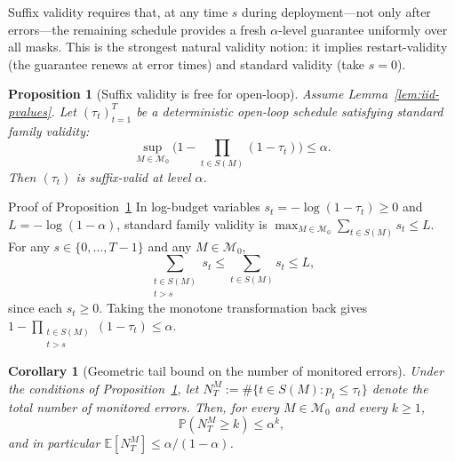 \documentclass{uai2026} %
\newtheorem{proposition}[theorem]{Proposition}
\newtheorem{corollary}[theorem]{Corollary}
\newcommand{\1}{\mathbf{1}}
\newcommand{\prob}{\mathbb{P}}
\newcommand{\expec}{\mathbb{E}}
\newcommand{\mcal}{\mathcal{M}}
\begin{document}
Suffix validity requires that, at any time $s$ during deployment---not only after errors---the remaining schedule provides a fresh $\alpha$-level guarantee uniformly over all masks.
This is the strongest natural validity notion: it implies restart-validity (the guarantee renews at error times) and standard validity (take $s=0$).

\begin{proposition}[Suffix validity is free for open-loop]
  \label{prop:suffix-validity}
  Assume Lemma~\ref{lem:iid-pvalues}.
  Let $(\tau_{t})_{t=1}^{T}$ be a deterministic open-loop schedule satisfying standard family validity:
  \begin{equation*}
    \sup_{M\in\mcal_{0}}\bigl(1-\prod_{t\in S(M)}(1-\tau_{t})\bigr)\le\alpha.
  \end{equation*}
  Then $(\tau_{t})$ is suffix-valid at level $\alpha$.
\end{proposition}

\begin{appendixproof}{Proof of Proposition~\ref{prop:suffix-validity}}
  In log-budget variables $s_{t}=-\log(1-\tau_{t})\ge 0$ and $L=-\log(1-\alpha)$, standard family validity is $\max_{M\in\mcal_{0}}\sum_{t\in S(M)} s_{t}\le L$.
  For any $s\in\{0,\dots,T-1\}$ and any $M\in\mcal_{0}$,
  \begin{equation*}
    \sum_{\substack{t\in S(M)\\t>s}} s_{t}
    \le
    \sum_{t\in S(M)} s_{t}
    \le L,
  \end{equation*}
  since each $s_{t}\ge 0$.
  Taking the monotone transformation back gives $1-\prod_{\substack{t\in S(M)\\t>s}}(1-\tau_{t})\le\alpha$.
\end{appendixproof}

\begin{corollary}[Geometric tail bound on the number of monitored errors]
  \label{cor:geometric-tail}
  Under the conditions of Proposition~\ref{prop:suffix-validity}, let $N_{T}^{M}:=\#\{t\in S(M):p_{t}\le\tau_{t}\}$ denote the total number of monitored errors.
  Then, for every $M\in\mcal_{0}$ and every $k\ge 1$,
  \begin{equation*}
    \prob(N_{T}^{M}\ge k)\le\alpha^{k},
  \end{equation*}
  and in particular $\expec[N_{T}^{M}]\le\alpha/(1-\alpha)$.
\end{corollary}
\end{document}
